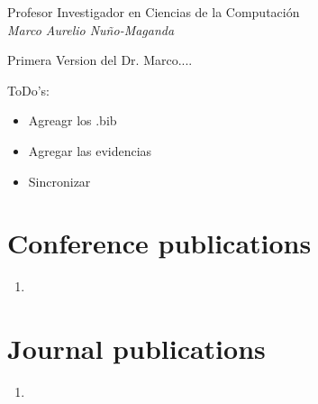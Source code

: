 \documentclass[letterpaper]{article}
\begin{document}
  \begin{center}
 Profesor Investigador en Ciencias de la Computación\\
    \emph{Marco Aurelio Nuño-Maganda}\\[0.5cm]
  \end{center}
  
  Primera Version del Dr. Marco....
  
  
  ToDo's:
  \begin{itemize}
  \item Agreagr los .bib
  \item Agregar las evidencias
  \item Sincronizar
  \end{itemize}
  

  \nocite{*}
  \printbibliography[title = {All my publications}]


  \section*{Conference publications}

  \begin{enumerate}
    \item {}
  \end{enumerate}

  \section*{Journal publications}

  \begin{enumerate}[resume]
    \item {}
  \end{enumerate}
\end{document}
